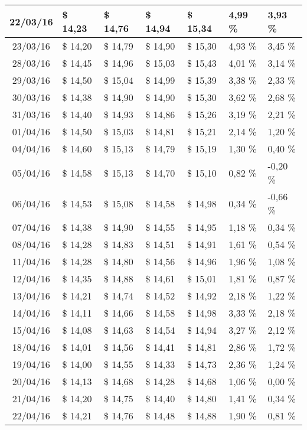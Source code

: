 \begin{center}
\begin{longtable}{|c|p{1.5cm}|p{1.5cm}|p{1.5cm}|p{1.5cm}|p{1.5cm}|p{1.5cm}|}
22/03/16 & \$ 14,23 & \$ 14,76 & \$ 14,94 & \$ 15,34 & 4,99 \% & 3,93 \% \\ \hline
23/03/16 & \$ 14,20 & \$ 14,79 & \$ 14,90 & \$ 15,30 & 4,93 \% & 3,45 \% \\ \hline
28/03/16 & \$ 14,45 & \$ 14,96 & \$ 15,03 & \$ 15,43 & 4,01 \% & 3,14 \% \\ \hline
29/03/16 & \$ 14,50 & \$ 15,04 & \$ 14,99 & \$ 15,39 & 3,38 \% & 2,33 \% \\ \hline
30/03/16 & \$ 14,38 & \$ 14,90 & \$ 14,90 & \$ 15,30 & 3,62 \% & 2,68 \% \\ \hline
31/03/16 & \$ 14,40 & \$ 14,93 & \$ 14,86 & \$ 15,26 & 3,19 \% & 2,21 \% \\ \hline
01/04/16 & \$ 14,50 & \$ 15,03 & \$ 14,81 & \$ 15,21 & 2,14 \% & 1,20 \% \\ \hline
04/04/16 & \$ 14,60 & \$ 15,13 & \$ 14,79 & \$ 15,19 & 1,30 \% & 0,40 \% \\ \hline
05/04/16 & \$ 14,58 & \$ 15,13 & \$ 14,70 & \$ 15,10 & 0,82 \% & -0,20 \% \\ \hline
06/04/16 & \$ 14,53 & \$ 15,08 & \$ 14,58 & \$ 14,98 & 0,34 \% & -0,66 \% \\ \hline
07/04/16 & \$ 14,38 & \$ 14,90 & \$ 14,55 & \$ 14,95 & 1,18 \% & 0,34 \% \\ \hline
08/04/16 & \$ 14,28 & \$ 14,83 & \$ 14,51 & \$ 14,91 & 1,61 \% & 0,54 \% \\ \hline
11/04/16 & \$ 14,28 & \$ 14,80 & \$ 14,56 & \$ 14,96 & 1,96 \% & 1,08 \% \\ \hline
12/04/16 & \$ 14,35 & \$ 14,88 & \$ 14,61 & \$ 15,01 & 1,81 \% & 0,87 \% \\ \hline
13/04/16 & \$ 14,21 & \$ 14,74 & \$ 14,52 & \$ 14,92 & 2,18 \% & 1,22 \% \\ \hline
14/04/16 & \$ 14,11 & \$ 14,66 & \$ 14,58 & \$ 14,98 & 3,33 \% & 2,18 \% \\ \hline
15/04/16 & \$ 14,08 & \$ 14,63 & \$ 14,54 & \$ 14,94 & 3,27 \% & 2,12 \% \\ \hline
18/04/16 & \$ 14,01 & \$ 14,56 & \$ 14,41 & \$ 14,81 & 2,86 \% & 1,72 \% \\ \hline
19/04/16 & \$ 14,00 & \$ 14,55 & \$ 14,33 & \$ 14,73 & 2,36 \% & 1,24 \% \\ \hline
20/04/16 & \$ 14,13 & \$ 14,68 & \$ 14,28 & \$ 14,68 & 1,06 \% & 0,00 \% \\ \hline
21/04/16 & \$ 14,20 & \$ 14,75 & \$ 14,40 & \$ 14,80 & 1,41 \% & 0,34 \% \\ \hline
22/04/16 & \$ 14,21 & \$ 14,76 & \$ 14,48 & \$ 14,88 & 1,90 \% & 0,81 \% \\ \hline

\end{longtable}
\end{center}
